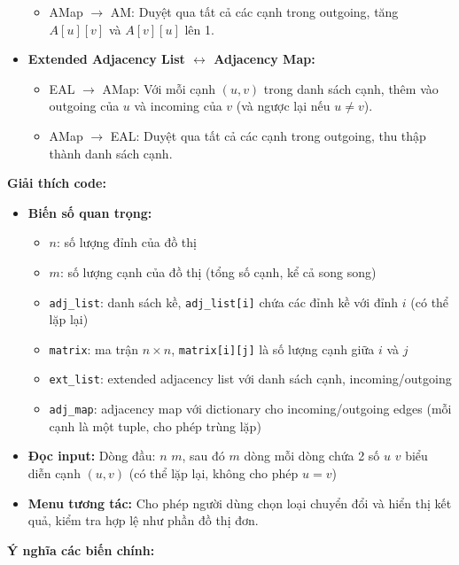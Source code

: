 \documentclass{article}
\begin{document}
\begin{itemize}
\begin{itemize}
        \item AMap $\to$ AM: Duyệt qua tất cả các cạnh trong outgoing, tăng $A[u][v]$ và $A[v][u]$ lên 1.
    \end{itemize}
    \item \textbf{Extended Adjacency List $\leftrightarrow$ Adjacency Map:}
    \begin{itemize}
        \item EAL $\to$ AMap: Với mỗi cạnh $(u,v)$ trong danh sách cạnh, thêm vào outgoing của $u$ và incoming của $v$ (và ngược lại nếu $u \neq v$).
        \item AMap $\to$ EAL: Duyệt qua tất cả các cạnh trong outgoing, thu thập thành danh sách cạnh.
    \end{itemize}
\end{itemize}

\textbf{Giải thích code:}

\begin{itemize}
    \item \textbf{Biến số quan trọng:}
    \begin{itemize}
        \item $n$: số lượng đỉnh của đồ thị
        \item $m$: số lượng cạnh của đồ thị (tổng số cạnh, kể cả song song)
        \item \texttt{adj\_list}: danh sách kề, \texttt{adj\_list[i]} chứa các đỉnh kề với đỉnh $i$ (có thể lặp lại)
        \item \texttt{matrix}: ma trận $n \times n$, \texttt{matrix[i][j]} là số lượng cạnh giữa $i$ và $j$
        \item \texttt{ext\_list}: extended adjacency list với danh sách cạnh, incoming/outgoing
        \item \texttt{adj\_map}: adjacency map với dictionary cho incoming/outgoing edges (mỗi cạnh là một tuple, cho phép trùng lặp)
    \end{itemize}
    \item \textbf{Đọc input:} Dòng đầu: $n$ $m$, sau đó $m$ dòng mỗi dòng chứa 2 số $u$ $v$ biểu diễn cạnh $(u,v)$ (có thể lặp lại, không cho phép $u = v$)
    \item \textbf{Menu tương tác:} Cho phép người dùng chọn loại chuyển đổi và hiển thị kết quả, kiểm tra hợp lệ như phần đồ thị đơn.
\end{itemize}

\textbf{Ý nghĩa các biến chính:}
\end{document}
